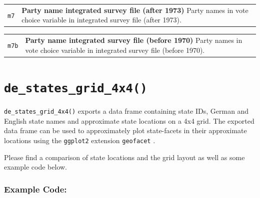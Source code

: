 \documentclass[
]{scrartcl}
\begin{document}
\begin{longtable}{p{3.2cm}| p{11cm}}
\texttt{m7} &\textbf{Party name integrated survey file (after 1973)}\newline 
Party names in vote choice variable in integrated survey file (after 1973).
\end{longtable}

\begin{longtable}{p{3.2cm}| p{11cm}}
\texttt{m7b} &\textbf{Party name integrated survey file (before 1970)}\newline 
Party names in vote choice variable in integrated survey file (before 1970).
\end{longtable}

\newpage

\hypertarget{de_states_grid_4x4}{%
\section{\texorpdfstring{\texttt{de\_states\_grid\_4x4()}}{de\_states\_grid\_4x4()}}\label{de_states_grid_4x4}}

\texttt{de\_states\_grid\_4x4()} exports a data frame containing state
IDs, German and English state names and approximate state locations on a
4x4 grid. The exported data frame can be used to approximately plot
state-facets in their approximate locations using the \texttt{ggplot2}
extension \texttt{geofacet} \autocite{hafenGeofacetGgplot2Faceting2020}.

Please find a comparison of state locations and the grid layout as well
as some example code below.

\hypertarget{example-code}{%
\subsubsection{Example Code:}\label{example-code}}
\end{document}

